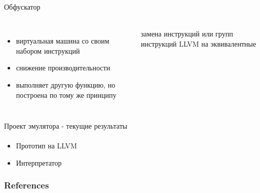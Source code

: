 \documentclass{beamer}              %
\begin{document}
\begin{frame}{Обфускатор}
  \framesubtitle{}
   
  \begin{columns}
      \begin{itemize}
        \item виртуальная машина со своим набором инструкций
        \item снижение производительности
        \item выполняет другую функцию, но построена по тому же принципу
      \end{itemize}

      замена инструкций или групп инструкций LLVM на эквивалентные
  \end{columns}		  
\end{frame}

\begin{frame}{Проект эмулятора - текущие результаты}
  \framesubtitle{}
  
  \begin{itemize}
      \item Прототип на LLVM
      \item Интерпретатор
  \end{itemize}
  
\end{frame}

\begin{frame}[allowframebreaks]
        \frametitle{References}
        
        
\end{frame}
\end{document}
